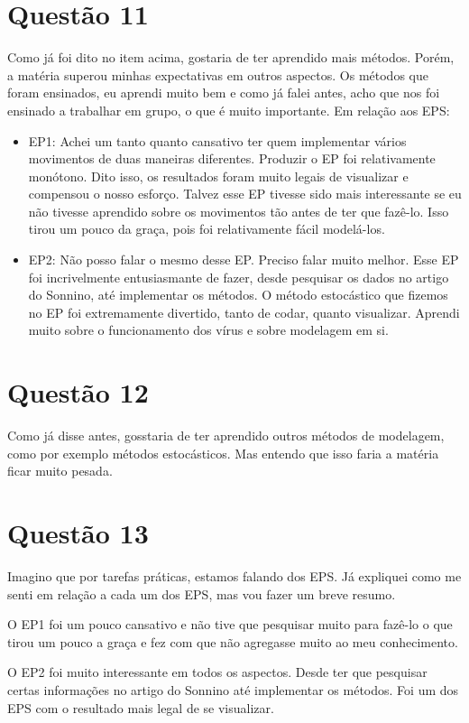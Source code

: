 \documentclass[11pt]{article}
\begin{document}
\section{Questão 11}
\label{sec:org612fbe0}
Como já foi dito no item acima, gostaria de ter aprendido mais métodos.
Porém, a matéria superou minhas expectativas em outros aspectos.
Os métodos que foram ensinados, eu aprendi muito bem e como já falei
antes, acho que nos foi ensinado a trabalhar em grupo, o que é muito
importante.
Em relação aos EPS:
\begin{itemize}
\item EP1: Achei um tanto quanto cansativo ter quem implementar vários 
movimentos de duas maneiras diferentes. Produzir o EP foi relativamente
monótono. Dito isso, os resultados foram muito legais de visualizar e
compensou o nosso esforço. Talvez esse EP tivesse sido mais 
interessante se eu não tivesse aprendido sobre os movimentos tão antes
de ter que fazê-lo. Isso tirou um pouco da graça, pois foi
relativamente fácil modelá-los.
\item EP2: Não posso falar o mesmo desse EP. Preciso falar muito melhor.
Esse EP foi incrivelmente entusiasmante de fazer, desde pesquisar os
dados no artigo do Sonnino, até implementar os métodos. O método
estocástico que fizemos no EP foi extremamente divertido, tanto de
codar, quanto visualizar. Aprendi muito sobre o funcionamento dos vírus
e sobre modelagem em si.
\end{itemize}

\section{Questão 12}
\label{sec:org5b8cadc}
Como já disse antes, gosstaria de ter aprendido outros métodos de 
modelagem, como por exemplo métodos estocásticos. Mas entendo que isso
faria a matéria ficar muito pesada.

\section{Questão 13}
\label{sec:org7cfa431}
Imagino que por tarefas práticas, estamos falando dos EPS. Já expliquei
como me senti em relação a cada um dos EPS, mas vou fazer um breve resumo.

O EP1 foi um pouco cansativo e não tive que pesquisar muito para fazê-lo
o que tirou um pouco a graça e fez com que não agregasse muito ao meu
conhecimento.

O EP2 foi muito interessante em todos os aspectos. Desde ter que
pesquisar certas informações no artigo do Sonnino até implementar os
métodos. Foi um dos EPS com o resultado mais legal de se visualizar.
\end{document}
